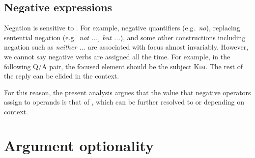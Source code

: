 \subsection{Negative expressions}
\label{10:sssec:neg}


Negation is sensitive to  \citep{partee:91,krifka:08}. For example, negative quantifiers
(e.g.\ \textit{no}), replacing sentential negation
(e.g.\ \textit{not ..., but ...}), and some other constructions
including negation such as \textit{neither ...} are associated with
focus almost invariably.  However, we cannot say negative verbs are
assigned  all the time. For example, in the following Q/A
pair, the focused element should be the subject \textsc{Kim}. The rest
of the reply can be elided in the context.


\noindent For this reason, the present analysis argues that the value
that negative operators assign to operands is that of ,
which can be further resolved to  or  depending on
context.



\section{Argument optionality}
\label{10:sec:arg-opt}

